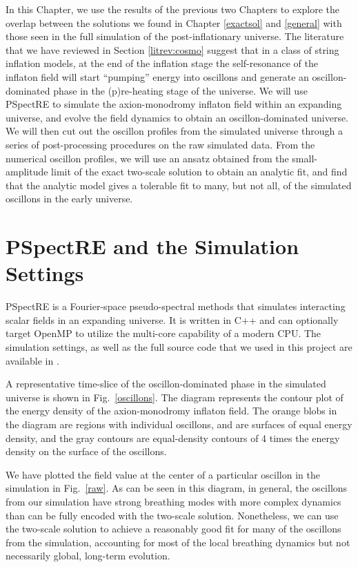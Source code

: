 \documentclass[11pt]{book}
\begin{document}
In this Chapter, we use the results of the previous two Chapters to explore the overlap between the solutions we found in Chapter \ref{exactsol} and \ref{general} with those seen in the full simulation of the post-inflationary universe. The literature that we have reviewed in Section \ref{litrev:cosmo} suggest that in a class of string inflation models, at the end of the inflation stage the self-resonance of the inflaton field will start ``pumping'' energy into oscillons and generate an oscillon-dominated phase in the (p)re-heating stage of the universe. We will use PSpectRE \cite{Easther:2010qz} to simulate the axion-monodromy inflaton field within an expanding universe, and evolve the field dynamics to obtain an oscillon-dominated universe. We will then cut out the oscillon profiles from the simulated universe through a series of post-processing procedures on the raw simulated data. From the numerical oscillon profiles, we will use an ansatz obtained from the small-amplitude limit of the exact two-scale solution to obtain an analytic fit, and find that the analytic model gives a tolerable fit to many, but not all, of the simulated oscillons in the early universe.

\section{PSpectRE and the Simulation Settings}
PSpectRE \cite{Easther:2010qz} is a Fourier-space pseudo-spectral methods that simulates interacting scalar fields in an expanding universe. It is written in C++ and can optionally target OpenMP to utilize the multi-core capability of a modern CPU. The simulation settings, as well as the full source code that we used in this project are available in \cite{pspectregh}.

A representative time-slice of the oscillon-dominated phase in the simulated universe is shown in Fig.~\ref{oscillons}. The diagram represents the contour plot of the energy density of the axion-monodromy inflaton field. The orange blobs in the diagram are regions with individual oscillons, and are surfaces of equal energy density, and the gray contours are equal-density contours of 4 times the energy density on the surface of the oscillons.

We have plotted the field value at the center of a particular oscillon in the simulation in Fig.~\ref{raw}. As can be seen in this diagram, in general, the oscillons from our simulation have strong breathing modes with more complex dynamics than can be fully encoded with the two-scale solution. Nonetheless, we can use the two-scale solution to achieve a reasonably good fit for many of the oscillons from the simulation, accounting for most of the local breathing dynamics but not necessarily global, long-term evolution.
\end{document}
